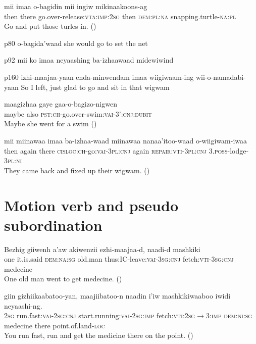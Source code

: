 \documentclass[oldfontcommands,oneside,a4paper,11pt]{article}
\begin{document}
\begin{exe}
\ex 
\gll
mii imaa o-bagidin mii ingiw mikinaakoons-ag \\
then there go.over-release:\textsc{vta}:\textsc{imp:2sg} then \textsc{dem:pl:na} snapping.turtle-\textsc{na:pl} \\
\glt Go and put those turles in. (\citealt[51]{kegg93portage})
\end{exe}
p80 o-bagida'waad she would go to set the net

p92 mii ko imaa neyaashing ba-izhaawaad midewiwind

p160 
izhi-maajaa-yaan enda-minwendam imaa wiigiwaam-ing wii-o-namadabi-yaan
So I left, just glad to go and sit in that wigwam

\begin{exe}
\ex 
\gll
maagizhaa gaye gaa-o-bagizo-nigwen \\
maybe also \textsc{pst:ch}-go.over-swim:\textsc{vai}-\textsc{3':cnj:dubit} \\
\glt Maybe she went for a swim (\citealt[74]{kegg93portage})
\end{exe}
\begin{exe}
\ex 
\gll
mii miinawaa imaa ba-izhaa-waad miinawaa nanaa'itoo-waad o-wiigiwam-iwaa \\
then again there \textsc{cisloc:ch}-go:\textsc{vai}-\textsc{3pl:cnj} again \textsc{repair:vti}-\textsc{3pl:cnj} \textsc{3.poss}-lodge-\textsc{3pl:ni} \\
\glt They came back and fixed up their wigwam. (\citealt[32]{kegg93portage})
\end{exe}

\section{Motion verb and pseudo subordination}

\begin{exe}
\ex 
\gll Bezhig giiwenh a'aw akiwenzii ezhi-maajaa-d, naadi-d mashkiki \\
 one it.is.said \textsc{dem:na:sg} old.man thus:IC-leave:\textsc{vai}-\textsc{3sg}:\textsc{cnj} fetch:\textsc{vti}-\textsc{3sg}:\textsc{cnj} medecine \\
\glt One old man went to get medecine. (\citealt[156]{kegg93portage})
\end{exe}


\begin{exe}
\ex 
\gll giin  gizhiikaabatoo-yan, maajiibatoo-n naadin i'iw mashkikiwaaboo iwidi neyaashi-ng. \\
 \textsc{2sg} run.fast:\textsc{vai}-\textsc{2sg:cnj} start.running:\textsc{vai}-\textsc{2sg:imp} fetch:\textsc{vti}:\textsc{2sg$\rightarrow$3:imp} \textsc{dem:ni:sg} medecine there point.of.land-\textsc{loc} \\
\glt You run fast, run and get the medicine there on the point. (\citealt[96]{kegg93portage})
\end{exe}




 
\end{document}
